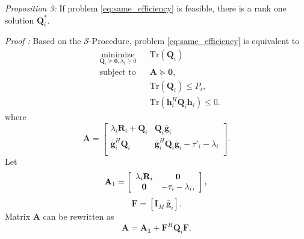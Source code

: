 \documentclass[journal]{IEEEtran}
\begin{document}
\emph{Proposition 3:} If problem \eqref{eq:same_efficiency} is feasible, there is a rank one solution $\mathbf{Q}_i^*$.

\emph{Proof :} Based on the $\mathcal{S}$-Procedure, problem \eqref{eq:same_efficiency} is equivalent to 
\begin{align} 
& \underset{\mathbf{Q}_i \succeq \mathbf{0}, \lambda_i \geq 0}{\text{minimize}}
& & \text{Tr}(\mathbf{Q}_i)\nonumber\\ 
& \text{subject to}
& & \mathbf{A} \succeq \mathbf{0},\label{eq:interference_budget}\\
&&& \text{Tr}\left(\mathbf{Q}_i\right) \leq P_i,\label{eq:power}\\ 
&&&\text{Tr}\left(\mathbf{h}_i^H\mathbf{Q}_i\mathbf{h}_i\right) \leq 0 \label{eq:ZF_constraint}.
\end{align}
where
\begin{equation}
\mathbf{A} = \left[ {\begin{array}{cc}
	\lambda_i\mathbf{R}_i+\mathbf{Q}_i  & \mathbf{Q}_i\bar{\mathbf{g}}_i \\
	\bar{\mathbf{g}}_i^H\mathbf{Q}_i& \bar{\mathbf{g}}_i^H\mathbf{Q}_i\bar{\mathbf{g}} _i- \tau'_i -\lambda_i\\
	\end{array} } \right]. \nonumber
\end{equation}
Let
\begin{equation}\nonumber
\mathbf{A}_1 = \left[ {\begin{array}{cc}
	\lambda_i\mathbf{R}_i  &\mathbf{0} \\
	\mathbf{0} & - \tau_i -\lambda_i,\\
	\end{array} } \right],\\
\end{equation}
\begin{equation}
\mathbf{F} = \left[\mathbf{I}_M  ~\bar{\mathbf{g}}_i\right]. \nonumber
\end{equation}
Matrix $\mathbf{A}$ can be rewritten as
\begin{equation}
\mathbf{A} = \mathbf{\mathbf{A}_1} + \mathbf{F}^H\mathbf{Q}_i\mathbf{F}. \label{eq:decompose_A}
\end{equation}
\end{document}
